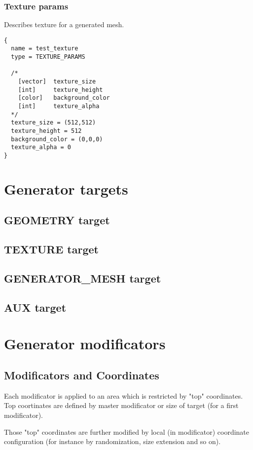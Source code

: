 \documentclass[11pt]{article}
\begin{document}
\subsubsection{Texture params}

Describes texture for a generated mesh.

\begin{verbatim}
{
  name = test_texture
  type = TEXTURE_PARAMS

  /*
    [vector]  texture_size
    [int]     texture_height
    [color]   background_color
    [int]     texture_alpha
  */
  texture_size = (512,512)  
  texture_height = 512
  background_color = (0,0,0)
  texture_alpha = 0
}
\end{verbatim}

\section{Generator targets}
\subsection{GEOMETRY target}
\subsection{TEXTURE target}
\subsection{GENERATOR\_MESH target}
\subsection{AUX target}

\section{Generator modificators}

\subsection{Modificators and Coordinates}

Each modificator is applied to an area which is restricted by "top" coordinates. 
Top coortinates are defined by master modificator or size of target 
(for a first modificator).

Those "top" coordinates are further modified by local (in modificator) 
coordinate configuration (for instance by randomization, size extension
and so on).
\end{document}
